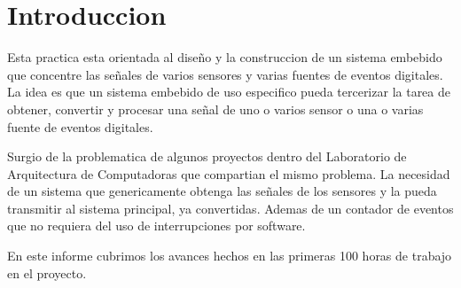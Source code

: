 \section{Introduccion} %
\label{sec:introduccion}

Esta practica esta orientada al dise\~no y la construccion de un sistema embebido que concentre las se\~nales de varios sensores y varias fuentes de eventos digitales. La idea es que un sistema embebido de uso especifico pueda tercerizar la tarea de obtener, convertir y procesar una se\~nal de uno o varios sensor o una o varias fuente de eventos digitales.

Surgio de la problematica de algunos proyectos dentro del Laboratorio de Arquitectura de Computadoras que compartian el mismo problema. La necesidad de un sistema que genericamente obtenga las se\~nales de los sensores y la pueda transmitir al sistema principal, ya convertidas. Ademas de un contador de eventos que no requiera del uso de interrupciones por software.

En este informe cubrimos los avances hechos en las primeras 100 horas de trabajo en el proyecto.

